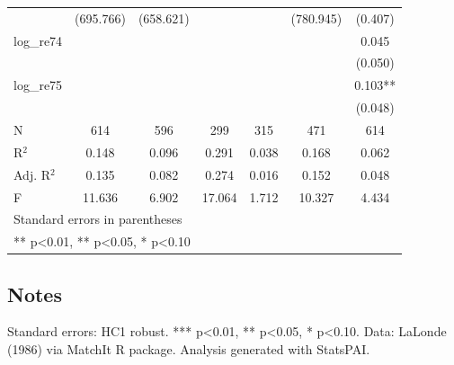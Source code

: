 \begin{table}[htbp]
\begin{tabular}{lcccccc}
 & (695.766) & (658.621) &  &  & (780.945) & (0.407) \\
log\_re74 &  &  &  &  &  & 0.045 \\
 &  &  &  &  &  & (0.050) \\
log\_re75 &  &  &  &  &  & 0.103** \\
 &  &  &  &  &  & (0.048) \\
\hline
N & 614 & 596 & 299 & 315 & 471 & 614 \\
R$^2$ & 0.148 & 0.096 & 0.291 & 0.038 & 0.168 & 0.062 \\
Adj. R$^2$ & 0.135 & 0.082 & 0.274 & 0.016 & 0.152 & 0.048 \\
F & 11.636 & 6.902 & 17.064 & 1.712 & 10.327 & 4.434 \\
\hline\hline
\multicolumn{7}{l}{\footnotesize Standard errors in parentheses} \\
\multicolumn{7}{l}{\footnotesize *** p<0.01, ** p<0.05, * p<0.10} \\
\end{tabular}
\end{table}

\subsection*{Notes}
Standard errors: HC1 robust. *** p<0.01, ** p<0.05, * p<0.10. Data: LaLonde (1986) via MatchIt R package. Analysis generated with StatsPAI.
